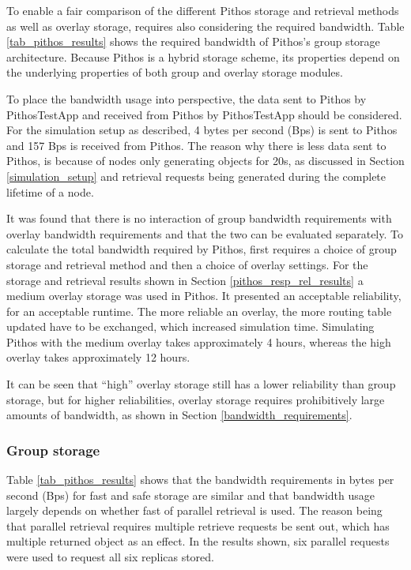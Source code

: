 To enable a fair comparison of the different Pithos storage and retrieval methods as well as overlay storage, requires also considering the required bandwidth. Table \ref{tab_pithos_results} shows the required bandwidth of Pithos's group storage architecture. Because Pithos is a hybrid storage scheme, its properties depend on the underlying properties of both group and overlay storage modules.

To place the bandwidth usage into perspective, the data sent to Pithos by PithosTestApp and received from Pithos by PithosTestApp should be considered. For the simulation setup as described, 4 bytes per second (Bps) is sent to Pithos and 157 Bps is received from Pithos. The reason why there is less data sent to Pithos, is because of nodes only generating objects for 20s, as discussed in Section \ref{simulation_setup} and retrieval requests being generated during the complete lifetime of a node.

It was found that there is no interaction of group bandwidth requirements with overlay bandwidth requirements and that the two can be evaluated separately. To calculate the total bandwidth required by Pithos, first requires a choice of group storage and retrieval method and then a choice of overlay settings. For the storage and retrieval results shown in Section \ref{pithos_resp_rel_results} a medium overlay storage was used in Pithos. It presented an acceptable reliability, for an acceptable runtime. The more reliable an overlay, the more routing table updated have to be exchanged, which increased simulation time. Simulating Pithos with the medium overlay takes approximately 4 hours, whereas the high overlay takes approximately 12 hours.

It can be seen that ``high'' overlay storage still has a lower reliability than group storage, but for higher reliabilities, overlay storage requires prohibitively large amounts of bandwidth, as shown in Section \ref{bandwidth_requirements}.

\subsubsection{Group storage}
Table \ref{tab_pithos_results} shows that the bandwidth requirements in bytes per second (Bps) for fast and safe storage are similar and that bandwidth usage largely depends on whether fast of parallel retrieval is used. The reason being that parallel retrieval requires multiple retrieve requests be sent out, which has multiple returned object as an effect. In the results shown, six parallel requests were used to request all six replicas stored.

